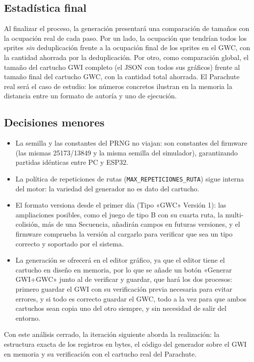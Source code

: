 \subsection{Estadística final}
\label{sec:F5Estadistica}
Al finalizar el proceso, la
generación presentará una comparación de tamaños con la ocupación
real de cada paso. Por un lado, la ocupación que tendrían todos los
sprites \emph{sin} deduplicación frente a la ocupación final de los
sprites en el GWC, con la cantidad ahorrada por la deduplicación.
Por otro, como comparación global, el tamaño del cartucho GWI
completo (el JSON con todos sus gráficos) frente al tamaño final
del cartucho GWC, con la cantidad total ahorrada. El Parachute real
será el caso de estudio: los números concretos ilustran en la
memoria la distancia entre un formato de autoría y uno de ejecución.


\subsection{Decisiones menores}
\label{sec:F5Menores}

\begin{itemize}
	\item La semilla y las constantes del PRNG no viajan: son
	constantes del firmware (las mismas 25173/13849 y la misma semilla
	del simulador), garantizando partidas idénticas entre PC y ESP32.
	
	\item La política de repeticiones de rutas
	(\texttt{MAX\_REPETICIONES\_RUTA}) sigue interna del motor: la
	variedad del generador no es dato del cartucho.
	
	\item El formato versiona desde el primer día (Tipo «GWC» Versión 1): las
	ampliaciones posibles, como el juego de tipo B con su cuarta ruta, la multi-colisión,
	más de una Secuencia, añadirán campos en futuras versiones, y el
	firmware comprueba la versión al cargarlo para verificar que sea un tipo correcto y soportado por el sistema.
	
	\item La generación se ofrecerá en el editor gráfico, ya que el editor tiene el cartucho en diseño en memoria, por lo que se añade un botón 
	«Generar GWI+GWC» junto al de verificar y guardar, que hará los dos procesos:
	primero guardar el GWI con su verificación previa necesaria para evitar errores, y si todo es
	correcto guardar el GWC, todo a la vez para que ambos cartuchos sean copia uno del otro siempre, y sin necesidad de salir del entorno.
	
	
\end{itemize}

Con este análisis cerrado, la iteración siguiente aborda la
realización: la estructura exacta de los registros en bytes, el
código del generador sobre el GWI en memoria y su verificación con
el cartucho real del Parachute.



